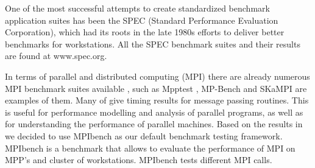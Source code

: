 One of the most successful attempts to create standardized benchmark
application suites has been the SPEC (Standard Performance Evaluation
Corporation), which had its roots in the late 1980s efforts to deliver better
benchmarks for workstations\cite{Hennessy}. All the SPEC benchmark suites and
their results are found at www.spec.org.

In terms of parallel and distributed computing (MPI) there are already numerous
MPI benchmark suites available , such as Mpptest \cite{Gropp}, MP-Bench
\cite{Calderon} and  SKaMPI \cite{Hoefler} are examples of them. Many of give
timing results for message passing routines. This is useful for performance
modelling and analysis of parallel programs, as well as for understanding the
performance of parallel machines. Based on the results in \cite{Grove} we
decided to use MPIbench as our default benchmark testing framework. MPIbench is
a benchmark that allows to evaluate the performance of MPI on MPP's and cluster
of workstations. MPIbench tests different MPI calls.

\clearpage
